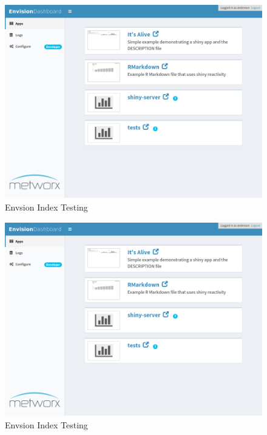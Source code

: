 \documentclass[]{article}
\begin{document}
\begin{figure}
\includegraphics[width=428px,height=321px]{Envision-Index-Testing_files/figure-latex/unnamed-chunk-2-1} \caption{Envsion Index Testing}\label{fig:unnamed-chunk-2}
\end{figure}\begin{figure}
\includegraphics[width=428px,height=321px]{Envision-Index-Testing_files/figure-latex/unnamed-chunk-2-2} \caption{Envsion Index Testing}\label{fig:unnamed-chunk-2}
\end{figure}
\end{document}
